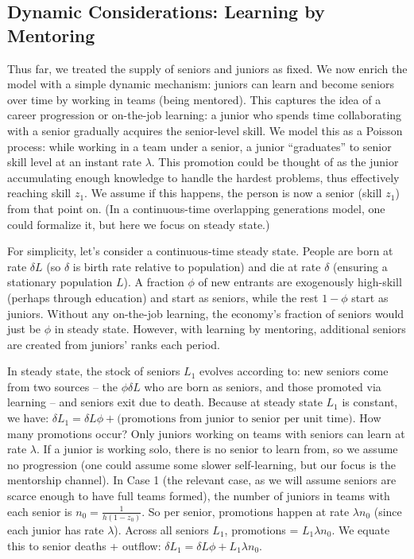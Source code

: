 \documentclass[12pt]{article}
\begin{document}
\subsection{Dynamic Considerations: Learning by
Mentoring}\label{dynamic-considerations-learning-by-mentoring}

Thus far, we treated the supply of seniors and juniors as fixed. We now
enrich the model with a {simple dynamic mechanism: juniors can
learn and become seniors over time by working in teams (being
mentored)}. This captures the idea of a {career progression or
on-the-job learning}: a junior who spends time collaborating with a
senior gradually acquires the senior-level skill. We model this as a
{Poisson process}: while working in a team under a senior, a
junior ``graduates'' to senior skill level at an instant rate
\(\lambda\). This promotion could be thought of as the junior
accumulating enough knowledge to handle the hardest problems, thus
effectively reaching skill \(z_1\). We assume if this happens, the
person is now a senior (skill \(z_1\)) from that point on. (In a
continuous-time overlapping generations model, one could formalize it,
but here we focus on steady state.)

For simplicity, let's consider a continuous-time steady state. People
are born at rate \(\delta L\) (so \(\delta\) is birth rate relative to
population) and die at rate \(\delta\) (ensuring a stationary population
\(L\)). A fraction \(\phi\) of new entrants are {exogenously}
high-skill (perhaps through education) and start as seniors, while the
rest \(1-\phi\) start as juniors. Without any on-the-job learning, the
economy's fraction of seniors would just be \(\phi\) in steady state.
However, {with learning by mentoring, additional seniors are
created from juniors' ranks} each period.

In steady state, the {stock of seniors \(L_1\)} evolves according
to: new seniors come from two sources -- the \(\phi \delta L\) who are
born as seniors, and those promoted via learning -- and seniors exit due
to death. Because at steady state \(L_1\) is constant, we have:
\(\delta L_1 = \delta L\phi + \text{(promotions from junior to senior per unit time)}.\)
How many promotions occur? Only juniors {working on teams} with
seniors can learn at rate \(\lambda\). If a junior is working solo,
there is no senior to learn from, so we assume no progression (one could
assume some slower self-learning, but our focus is the mentorship
channel). In Case 1 (the relevant case, as we will assume seniors are
scarce enough to have full teams formed), the number of juniors in teams
with each senior is \(n_0 = \frac{1}{h(1-z_0)}\). So per senior,
promotions happen at rate \(\lambda n_0\) (since each junior has rate
\(\lambda\)). Across all seniors \(L_1\), promotions =
\(L_1 \lambda n_0\). We equate this to senior deaths + outflow:
\(\delta L_1 = \delta L \phi + L_1 \lambda n_0.\)
\end{document}
